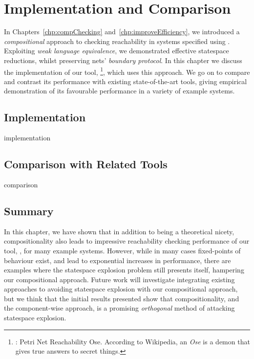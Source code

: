 \chapter{Implementation and Comparison}\label{chp:comparisonAndDiscussion}

In Chapters~\ref{chp:compChecking} and~\ref{chp:improveEfficiency}, we
introduced a \emph{compositional} approach to checking reachability in systems
specified using \DSL. Exploiting \emph{weak language equivalence}, we
demonstrated effective statespace reductions, whilst preserving nets'
\emph{boundary protocol}. In this chapter we discuss the implementation of our
tool, \penrose{}\footnote{\penrose{}: Petri Net Reachability Ose. According to
Wikipedia, an \emph{Ose} is a demon that gives true answers to secret things.},
which uses this approach. We go on to compare and contrast its performance with
existing state-of-the-art tools, giving empirical demonstration of its
favourable performance in a variety of example systems.

\section{Implementation}
{implementation}

\section{Comparison with Related Tools}
{comparison}

\section{Summary}

In this chapter, we have shown that in addition to being a theoretical nicety,
compositionality also leads to impressive reachability checking performance of
our tool, \penrose, for many example systems. However, while in many cases
fixed-points of behaviour exist, and lead to exponential increases in
performance, there are examples where the statespace explosion problem still
presents itself, hampering our compositional approach. Future work will
investigate integrating existing approaches to avoiding statespace explosion
with our compositional approach, but we think that the initial results
presented show that compositionality, and the component-wise approach, is a
promising \emph{orthogonal} method of attacking statespace explosion.

